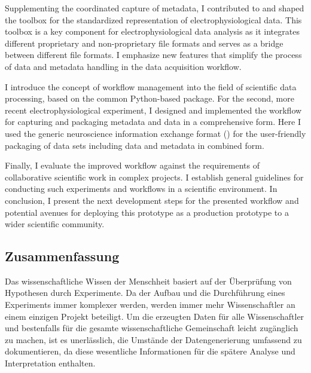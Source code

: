 \begin{minipage}[t][0pt]{\linewidth}
Supplementing the coordinated capture of metadata, I contributed to and shaped the  toolbox for the standardized representation of electrophysiological data. This toolbox is a key component for electrophysiological data analysis as it integrates different proprietary and non-proprietary file formats and serves as a bridge between different file formats. I emphasize new features that simplify the process of data and metadata handling in the data acquisition workflow.

I introduce the concept of workflow management into the field of scientific data processing, based on the common Python-based  package. For the second, more recent electrophysiological experiment, I designed and implemented the workflow for capturing and packaging metadata and data in a comprehensive form. Here I used the generic neuroscience information exchange format () for the user-friendly packaging of data sets including data and metadata in combined form.

Finally, I evaluate the improved workflow against the requirements of collaborative scientific work in complex projects. I establish general guidelines for conducting such experiments and workflows in a scientific environment. In conclusion, I present the next development steps for the presented workflow and potential avenues for deploying this prototype as a production prototype to a wider scientific community.
\end{minipage}

\clearpage
\thispagestyle{empty}
\subsection*{Zusammenfassung}

Das wissenschaftliche Wissen der Menschheit basiert auf der Überprüfung von Hypothesen durch Experimente.
Da der Aufbau und die Durchführung eines Experiments immer komplexer werden, werden immer mehr Wissenschaftler an einem einzigen Projekt beteiligt. Um die erzeugten Daten für alle Wissenschaftler und bestenfalls für die gesamte wissenschaftliche Gemeinschaft leicht zugänglich zu machen, ist es unerlässlich, die Umstände der Datengenerierung umfassend zu dokumentieren, da diese wesentliche Informationen für die spätere Analyse und Interpretation enthalten.

